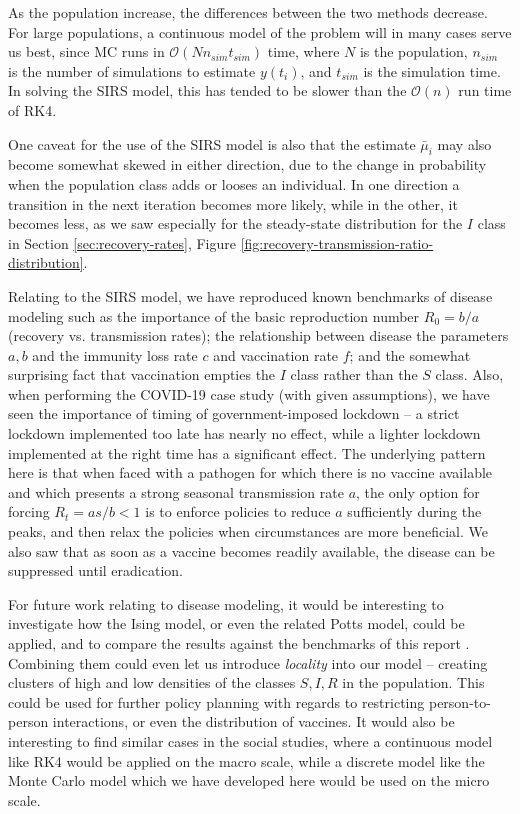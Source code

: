 \documentclass[]{article}
\begin{document}
As the population increase, the differences between the two methods decrease. For large populations, a continuous model of the problem will in many cases serve us best, since MC runs in $\mathcal{O}(Nn_{sim}t_{sim})$ time, where $N$ is the population, $n_{sim}$ is the number of simulations to estimate $y(t_i)$, and $t_{sim}$ is the simulation time. In solving the SIRS model, this has tended to be slower than the $\mathcal{O}(n)$ run time of RK4.

One caveat for the use of the SIRS model is also that the estimate $\bar{\mu}_i$ may also become somewhat skewed in either direction, due to the change in probability when the population class adds or looses an individual. In one direction a transition in the next iteration becomes more likely, while in the other, it becomes less, as we saw especially for the steady-state distribution for the $I$ class in Section \ref{sec:recovery-rates}, Figure \ref{fig:recovery-transmission-ratio-distribution}.

Relating to the SIRS model, we have reproduced known benchmarks of disease modeling such as the importance of the basic reproduction number $R_0 = b/a$ (recovery vs. transmission rates); the relationship between disease the parameters $a,b$ and the immunity loss rate $c$ and vaccination rate $f$; and the somewhat surprising fact that vaccination empties the $I$ class rather than the $S$ class. Also, when performing the COVID-19 case study (with given assumptions), we have seen the importance of timing of government-imposed lockdown -- a strict lockdown implemented too late has nearly no effect, while a lighter lockdown implemented at the right time has a significant effect. The underlying pattern here is that when faced with a pathogen for which there is no vaccine available and which presents a strong seasonal transmission rate $a$, the only option for forcing $R_t = as/b < 1$ is to enforce policies to reduce $a$ sufficiently during the peaks, and then relax the policies when circumstances are more beneficial. We also saw that as soon as a vaccine becomes readily available, the disease can be suppressed until eradication.

For future work relating to disease modeling, it would be interesting to investigate how the Ising model, or even the related Potts model, could be applied, and to compare the results against the benchmarks of this report \cite{fys4150-notes}. Combining them could even let us introduce \textit{locality} into our model -- creating clusters of high and low densities of the classes $S,I,R$ in the population. This could be used for further policy planning with regards to restricting person-to-person interactions, or even the distribution of vaccines. It would also be interesting to find similar cases in the social studies, where a continuous model like RK4 would be applied on the macro scale, while a discrete model like the Monte Carlo model which we have developed here would be used on the micro scale.




\end{document}
